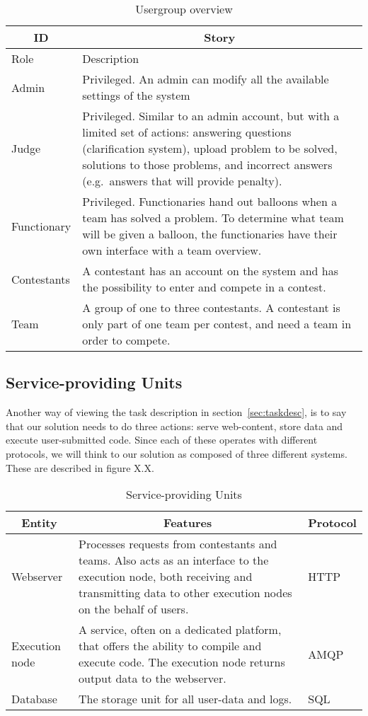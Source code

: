 \begin{longtable}{|p{}|p{}|}
\caption{Usergroup overview} \label{table:usegroup}\\
\hline
\multicolumn{1}{|c|}{\textbf{ID}} &
\multicolumn{1}{c|}{\textbf{Story}} \\
\hline
Role &
Description\\\hline
Admin &
Privileged. An admin can modify all the available settings of the
system\\\hline
Judge &
Privileged. Similar to an admin account, but with a limited set of
actions: answering questions (clarification system), upload problem to be
solved, solutions to those problems, and incorrect answers (e.g.\ answers
that will provide penalty).\\\hline
Functionary &
Privileged. Functionaries hand out balloons when a team has solved a
problem. To determine what team will be given a balloon, the functionaries
have their own interface with a team overview.\\\hline
Contestants &
A contestant has an account on the system and has the possibility to
enter and compete in a contest. \\\hline
Team &
A group of one to three contestants. A contestant is only part of one
team per contest, and need a team in order to compete. \\\hline

\end{longtable}

\subsection{Service-providing Units}

Another way of viewing the task description in section~\ref{sec:taskdesc}, is to say
that our solution needs to do three actions: serve web-content, store
data and execute user-submitted code. Since each of these operates with
different protocols, we will think to our solution as composed of three
different systems. These are described in figure X.X. 

\pagebreak
\begin{longtable}{|l|m{}|m{}|}
\caption{Service-providing Units} \label{table:serviceUnits} \\
\hline
\hline \multicolumn{1}{|c|}{\textbf{Entity}} &
\multicolumn{1}{c|}{\textbf{Features}} &
\multicolumn{1}{c|}{\textbf{Protocol}} \\
\hline
Webserver & Processes requests from contestants and teams. Also acts as an
interface to the execution node, both receiving and transmitting data
to other execution nodes on the behalf of users. & HTTP\\\hline

Execution node & A service, often on a dedicated platform, that offers the
ability to compile and execute code. The execution node returns output data to
the webserver. & AMQP\\\hline

Database & The storage unit for all user{}-data and logs. & SQL\\\hline
\end{longtable}



